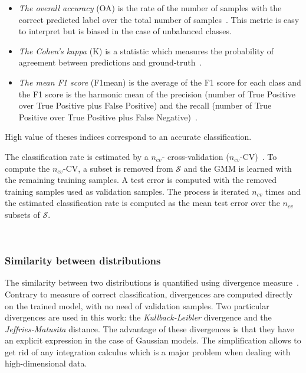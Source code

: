 \documentclass[journal]{IEEEtran}
\begin{document}
        \begin{itemize}
        \item  \emph{The overall  accuracy} (OA)  is the  rate of  the
          number of samples with the  correct predicted label over the
          total  number of  samples~\cite{congalton2008assessing}. This
          metric is  easy to interpret  but is  biased in the  case of
          unbalanced classes.

        \item \emph{The Cohen's kappa} (K) is a statistic which measures the probability of agreement between predictions and ground-truth~\cite{congalton2008assessing}.

        \item \emph{The mean F1 score}  (F1mean) is the average of the
          F1 score  for each class  and the  F1 score is  the harmonic
          mean of  the precision  (number of  True Positive  over True
          Positive plus False Positive) and the recall (number of True
          Positive over True Positive plus False Negative)~\cite{powers2011evaluation}.
        \end{itemize}
        High  value  of  theses  indices  correspond  to  an  accurate
        classification.

        The classification rate is  estimated by a $n_{cv}$- cross-validation ($n_{cv}$-CV)~\cite{opac-b1127878}.  To compute the $n_{cv}$-CV, a subset is removed  from $\mathcal{S}$ and  the GMM is learned with the remaining training samples. A test error is computed with the removed  training  samples  used  as  validation  samples.   The process is  iterated $n_{cv}$ times and  the estimated classification rate is computed as the mean  test error over the $n_{cv}$ subsets of $\mathcal{S}$.

        \hspace{0pt} \\

        \subsubsection{Similarity between distributions}
        The similarity  between two distributions is  quantified using
        divergence  measure~\cite{opac-b1097517}. Contrary  to measure
        of correct  classification, divergences are  computed directly
        on the trained model, with no need of validation samples.  Two
        particular   divergences   are   used  in   this   work:   the
        \emph{Kullback-Leibler}        divergence       and        the
        \emph{Jeffries-Matusita}  distance.  The  advantage  of  these
        divergences is  that they have  an explicit expression  in the
        case of Gaussian models. The  simplification allows to get rid
        of  any integration  calculus which  is a  major problem  when
        dealing with high-dimensional data.
\end{document}
